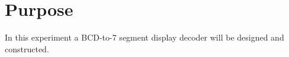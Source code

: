 \section{Purpose}

In this experiment a BCD-to-7 segment display decoder will be designed and constructed.